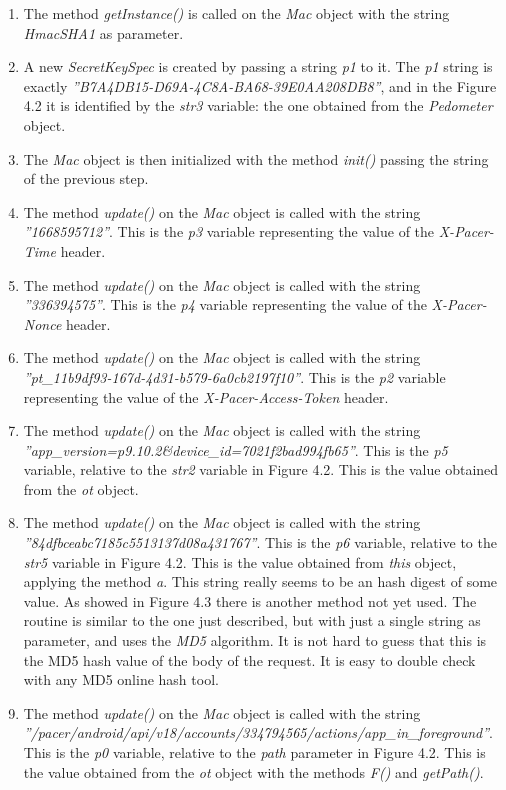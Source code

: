 			\begin{enumerate}
			\item The method \textit{getInstance()} is called on the \textit{Mac} object with the string \textit{HmacSHA1} as parameter.
			\item A new \textit{SecretKeySpec} is created by passing a string \textit{p1} to it.  The \textit{p1} string is exactly \textit{''B7A4DB15-D69A-4C8A-BA68-39E0AA208DB8''}, and in the Figure 4.2 it is identified by the \textit{str3} variable: the one obtained from the \textit{Pedometer} object.
			\item The \textit{Mac} object is then initialized with the method \textit{init()} passing the string of the previous step.
			\item The method \textit{update()} on the \textit{Mac} object is called with the string \textit{''1668595712''}. This is the \textit{p3} variable representing the value of the \textit{X-Pacer-Time} header.
			\item The method \textit{update()} on the \textit{Mac} object is called with the string \textit{''336394575''}. This is the \textit{p4} variable representing the value of the \textit{X-Pacer-Nonce} header.
			\item The method \textit{update()} on the \textit{Mac} object is called with the string \textit{''pt\_11b9df93-167d-4d31-b579-6a0cb2197f10''}. This is the \textit{p2} variable representing the value of the \textit{X-Pacer-Access-Token} header.
			\item The method \textit{update()} on the \textit{Mac} object is called with the string \newline
			\textit{''app\_version=p9.10.2\&device\_id=7021f2bad994fb65''}. This is the \textit{p5} variable, relative to the \textit{str2} variable in Figure 4.2. This is the value obtained from the \textit{ot} object.
			\item The method \textit{update()} on the \textit{Mac} object is called with the string \textit{''84dfbceabc7185c5513137d08a431767''}. This is the \textit{p6} variable, relative to the \textit{str5} variable in Figure 4.2. This is the value obtained from \textit{this} object, applying the method \textit{a}. This string really seems to be an hash digest of some value. As showed in Figure 4.3 there is another method not yet used. The routine is similar to the one just described, but with just a single string as parameter, and uses the \textit{MD5} algorithm. It is not hard to guess that this is the MD5 hash value of the body of the request. It is easy to double check with any MD5 online hash tool.
			\item The method \textit{update()} on the \textit{Mac} object is called with the string \textit{''/pacer/android/api/v18/accounts/334794565/actions/app\_in\_foreground''}. This is the \textit{p0} variable, relative to the \textit{path} parameter in Figure 4.2. This is the value obtained from the \textit{ot} object with the methods \textit{F()} and \textit{getPath()}.
			\end{enumerate}
